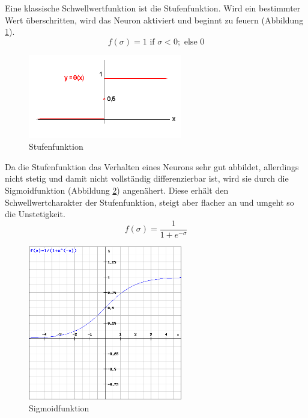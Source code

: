 Eine klassische Schwellwertfunktion ist die Stufenfunktion. Wird ein bestimmter Wert überschritten, wird das Neuron aktiviert und beginnt zu feuern (Abbildung \ref{stufe}).
\begin{equation}
f(\sigma) = 1 \mbox{ if } \sigma < 0;  \mbox{ else } 0
\end{equation}
\begin{figure}[h]
\centering
\includegraphics[width=0.6\textwidth]{pictures/stufenfunktion.png}
\caption{Stufenfunktion \cite{bib:stufe}}
\label{stufe}
\end{figure}

Da die Stufenfunktion das Verhalten eines Neurons sehr gut abbildet, allerdings nicht stetig und damit nicht vollständig differenzierbar ist, wird sie durch die Sigmoidfunktion (Abbildung \ref{sigmoid}) angenähert. Diese erhält den Schwellwertcharakter der Stufenfunktion, steigt aber flacher an und umgeht so die Unstetigkeit.
\begin{equation}
f(\sigma) = \frac{1}{1+e^{-\sigma}}
\end{equation}
\begin{figure}[h]
\centering
\includegraphics[width=0.6\textwidth]{pictures/sigmoid.png}
\caption{Sigmoidfunktion}
\label{sigmoid}

\end{figure}

